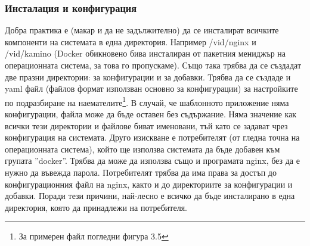\documentclass[pdftex,14pt,a4paper]{extreport}
\begin{document}
\subsubsection {Инсталация и конфигурация}
Добра практика е (макар и да не задължително) да се инсталират всичките компоненти на системата в една директория. Например /vid/nginx и /vid/kamino (Docker обикновено бива инсталиран от пакетния мениджър на операционната система, за това го пропускаме). Също така трябва да се създадат две празни директории: за конфигурации и за добавки. Трябва да се създаде и yaml файл (файлов формат използван основно за конфигурации) за настройките по подразбиране на наемателите\footnote{За примерен файл погледни фигура 3.5}. В случай, че шаблонното приложение няма конфигурации, файла може да бъде оставен без съдържание. Няма значение как всички тези директории и файлове биват именовани, тъй като се задават чрез конфигурация на системата. Друго изискване е потребителят (от гледна точна на операционната система), който ще използва системата да бъде добавен към групата ''docker''. Трябва да може да използва също и програмата nginx, без да е нужно да въвежда парола. Потребителят трябва да има права за достъп до конфигурационния файл на nginx, както и до директориите за конфигурации и добавки. Поради тези причини, най-лесно е всичко да бъде инсталирано в една директория, която да принадлежи на потребителя.
\end{document}
